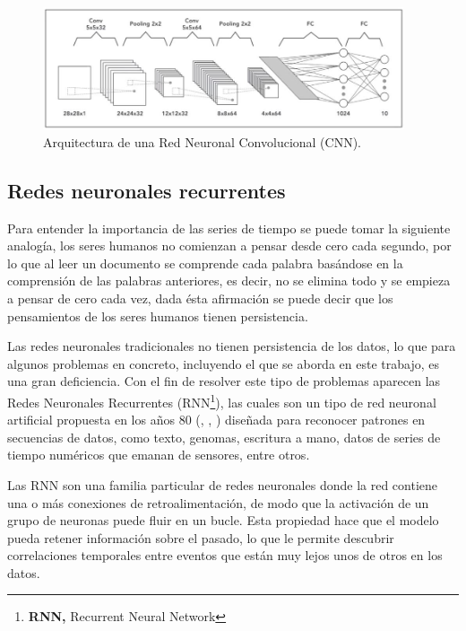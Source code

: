 \begin{figure}[h!]
  \begin{center}	\includegraphics[width=0.95\textwidth]{imagenes/Cap4/cnn}
  \caption{Arquitectura de una Red Neuronal Convolucional (CNN).}
  \label{fig:cnn}
  \end{center}
\end{figure}

\subsection{Redes neuronales recurrentes}

Para entender la importancia de las series de tiempo se puede tomar la siguiente analog\'{i}a, los seres humanos no comienzan a pensar desde cero cada segundo, por lo que al leer un documento se comprende cada palabra bas\'{a}ndose en la comprensi\'{o}n de las palabras anteriores, es decir, no se elimina todo y se empieza a pensar de cero cada vez, dada \'{e}sta afirmaci\'{o}n se puede decir que los pensamientos de los seres humanos tienen persistencia.

\vspace{5mm} %

Las redes neuronales tradicionales no tienen persistencia de los datos, lo que para algunos problemas en concreto, incluyendo el que se aborda en este trabajo, es una gran deficiencia. Con el fin de resolver este tipo de problemas aparecen las Redes Neuronales Recurrentes (RNN\footnote{\textbf{RNN,} Recurrent Neural Network}), las cuales son un tipo de red neuronal artificial propuesta en los a\~{n}os 80 (\cite{34}, \cite{35}, \cite{36}) dise\~{n}ada para reconocer patrones en secuencias de datos, como texto, genomas, escritura a mano, datos de series de tiempo num\'{e}ricos que emanan de sensores, entre otros.

\vspace{5mm} %

Las RNN son una familia particular de redes neuronales donde la red contiene una o más conexiones de retroalimentación, de modo que la activación de un grupo de neuronas puede fluir en un bucle. Esta propiedad hace que el modelo pueda retener informaci\'{o}n sobre el pasado, lo que le permite descubrir correlaciones temporales entre eventos que est\'{a}n muy lejos unos de otros en los datos.

